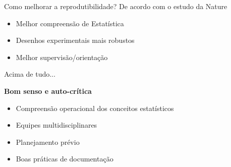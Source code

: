 \documentclass{beamer}
\begin{document}
\begin{frame}
  \begin{block}{Como melhorar a reprodutibilidade?}
    De acordo com o estudo da Nature
    \begin{itemize}
    \item Melhor compreensão de Estatística
    \item Desenhos experimentais mais robustos
    \item Melhor supervisão/orientação
    \end{itemize}
  \end{block}
\end{frame}


\begin{frame}{Acima de tudo...}
  \begin{center}
    {\bf Bom senso e auto-crítica}
  \end{center}
\end{frame}

\begin{frame}{}
  \begin{itemize}
  \item Compreensão operacional dos conceitos estatísticos
  \item Equipes multidisciplinares
  \item Planejamento prévio
  \item Boas práticas de documentação
  \end{itemize}
\end{frame}
\end{document}
